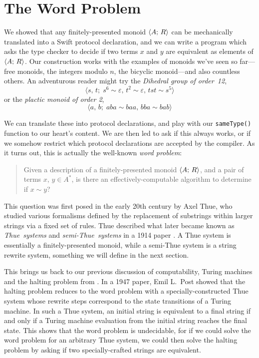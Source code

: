 \documentclass[../generics]{subfiles}
\begin{document}
\section{The Word Problem}\label{word problem}

We showed that any finitely-presented monoid $\langle A;\,R\rangle$ can be mechanically translated into a Swift protocol declaration, and we can write a program which asks the type checker to decide if two terms $x$ and $y$ are equivalent as elements of $\langle A;\,R\rangle$. Our construction works with the examples of monoids we've seen so far---free monoids, the integers modulo $n$, the bicyclic monoid---and also countless others. An adventurous reader might try the \emph{Dihedral group of order~12},
\[\langle s,\,t;\; s^6\sim\varepsilon,\, t^2\sim\varepsilon,\, tst\sim s^5\rangle\]
or the \emph{plactic monoid of order 2},
\[\langle a,\,b;\; aba\sim baa,\, bba\sim bab\rangle\]

We can translate these into protocol declarations, and play with our \texttt{sameType()} function to our heart's content. We are then led to ask if this always works, or if we somehow restrict which protocol declarations are accepted by the compiler. As it turns out, this is actually the well-known \emph{word problem}:
\begin{quote}
Given a description of a finitely-presented monoid $\langle A;\,R\rangle$, and a pair of terms $x$, $y\in A^*$, is there an effectively-computable algorithm to determine if $x\sim y$?
\end{quote}

This question was first posed in the early 20th century by Axel Thue, who studied various formalisms defined by the replacement of substrings within larger strings via a fixed set of rules. Thue described what later became known as \emph{Thue~systems} and \emph{semi-Thue~systems} in a 1914 paper \cite{thue_translation}. A Thue system is essentially a finitely-presented monoid, while a semi-Thue system is a string rewrite system, something we will define in the next section.

This brings us back to our previous discussion of computability, Turing machines and the halting problem from . In a 1947 paper, Emil L.~Post showed that the halting problem reduces to the word problem with a specially-constructed Thue system whose rewrite steps correspond to the state transitions of a Turing machine. In such a Thue system, an initial string is equivalent to a final string if and only if a Turing machine evaluation from the initial string reaches the final state. This shows that the word problem is undecidable, for if we could solve the word problem for an arbitrary Thue system, we could then solve the halting problem by asking if two specially-crafted strings are equivalent.
\end{document}
